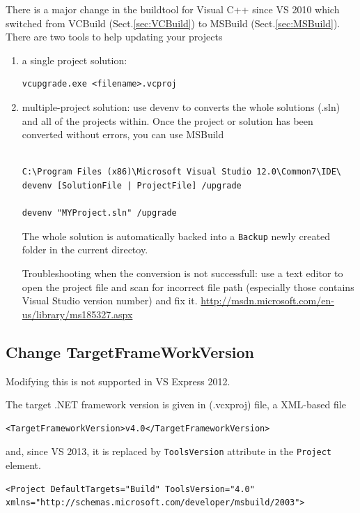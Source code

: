 There is a major change in the buildtool for Visual C++ since VS 2010 which
switched from VCBuild (Sect.\ref{sec:VCBuild}) to MSBuild
(Sect.\ref{sec:MSBuild}).
There are two tools to help updating your projects
\begin{enumerate}
  \item a single project solution: 
  
\begin{verbatim}
vcupgrade.exe <filename>.vcproj
\end{verbatim}  

  \item multiple-project solution: use devenv to converts the whole solutions
  (.sln) and all of the projects within.  Once the project or solution has been
  converted without errors, you can use MSBuild 
\begin{verbatim}

C:\Program Files (x86)\Microsoft Visual Studio 12.0\Common7\IDE\
devenv [SolutionFile | ProjectFile] /upgrade

devenv "MYProject.sln" /upgrade
\end{verbatim}
The whole solution is automatically backed into a \verb!Backup! newly created
folder in the current directoy. 

Troubleshooting when the conversion is not successfull: use a text editor to
open the project file and scan for incorrect file path (especially those
contains Visual Studio version number) and fix it.
\url{http://msdn.microsoft.com/en-us/library/ms185327.aspx}



\end{enumerate}

\subsection{Change TargetFrameWorkVersion}

Modifying this is not supported in VS Express 2012.

The target .NET framework version is given in (.vcxproj) file,
a XML-based file 
\begin{verbatim}
<TargetFrameworkVersion>v4.0</TargetFrameworkVersion>
\end{verbatim}
and, since VS 2013, it is replaced by \verb!ToolsVersion! attribute in the
\verb!Project! element.
\begin{verbatim}
<Project DefaultTargets="Build" ToolsVersion="4.0" xmlns="http://schemas.microsoft.com/developer/msbuild/2003">
\end{verbatim}

